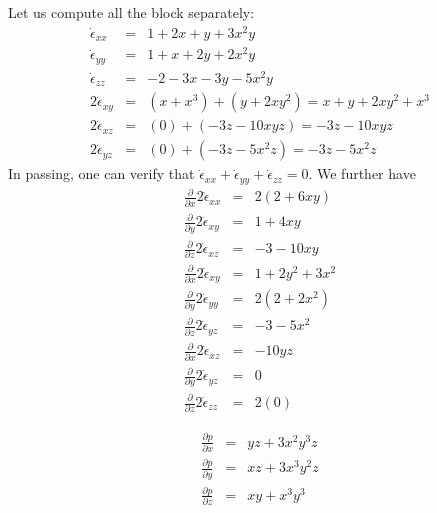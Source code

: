 Let us compute all the block separately:
\begin{eqnarray}
\dot{\epsilon}_{xx}&=& 1+2x+y+3x^2y  \nonumber\\
\dot{\epsilon}_{yy}&=& 1+x+2y+2x^2y \nonumber\\
\dot{\epsilon}_{zz}&=& -2-3x-3y-5x^2y \nonumber\\
2 \dot{\epsilon}_{xy}&=& (x+x^3)+(y+2xy^2) = x+y+2xy^2+x^3 \nonumber\\
2 \dot{\epsilon}_{xz}&=& (0)+(-3z-10xyz) = -3z -10xyz  \nonumber\\
2 \dot{\epsilon}_{yz}&=& (0) + (-3z-5x^2z) = -3z-5x^2z   \nonumber
\end{eqnarray}
In passing, one can verify that 
$
\dot{\epsilon}_{xx}
+\dot{\epsilon}_{yy}
+\dot{\epsilon}_{zz}=0
$.
We further have
\begin{eqnarray}
\frac{\partial}{\partial x} 2\dot{\epsilon}_{xx}&=& 2(2 +6xy) \nonumber\\ 
\frac{\partial}{\partial y} 2\dot{\epsilon}_{xy}&=&  1+4xy \nonumber\\
\frac{\partial}{\partial z} 2\dot{\epsilon}_{xz}&=& -3 -10xy   \nonumber\\ 
\frac{\partial}{\partial x} 2\dot{\epsilon}_{xy}&=& 1+2y^2+3x^2 \nonumber\\ 
\frac{\partial}{\partial y} 2\dot{\epsilon}_{yy}&=& 2( 2+2x^2 ) \nonumber\\ 
\frac{\partial}{\partial z} 2\dot{\epsilon}_{yz}&=& -3-5x^2   \nonumber\\
\frac{\partial}{\partial x} 2\dot{\epsilon}_{xz}&=& -10yz \nonumber\\ 
\frac{\partial}{\partial y} 2\dot{\epsilon}_{yz}&=& 0  \nonumber\\ 
\frac{\partial}{\partial z} 2\dot{\epsilon}_{zz}&=& 2( 0 ) \nonumber
\end{eqnarray}

\begin{eqnarray}
\frac{\partial p}{\partial x} &=& yz+3x^2y^3z\\
\frac{\partial p}{\partial y} &=& xz +3x^3y^2z \\
\frac{\partial p}{\partial z} &=& xy+x^3y^3
\end{eqnarray}

